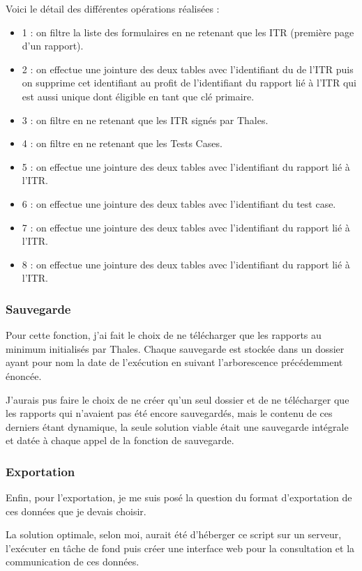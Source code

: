 Voici le détail des différentes opérations réalisées :
\begin{itemize}
\item 1 : on filtre la liste des formulaires en ne retenant que les ITR (première page d'un rapport).
\item 2 : on effectue une jointure des deux tables avec l'identifiant du de l'ITR puis on supprime cet identifiant au profit de l'identifiant du rapport lié à l'ITR qui est aussi unique dont éligible en tant que clé primaire.
\item 3 : on filtre en ne retenant que les ITR signés par Thales.
\item 4 : on filtre en ne retenant que les Tests Cases.
\item 5 : on effectue une jointure des deux tables avec l'identifiant du rapport lié à l'ITR.
\item 6 : on effectue une jointure des deux tables avec l'identifiant du test case.
\item 7 : on effectue une jointure des deux tables avec l'identifiant du rapport lié à l'ITR.
\item 8 : on effectue une jointure des deux tables avec l'identifiant du rapport lié à l'ITR.
\end{itemize}

\subsubsection{Sauvegarde}
Pour cette fonction, j'ai fait le choix de ne télécharger que les rapports au minimum initialisés par Thales. Chaque sauvegarde est stockée dans un dossier ayant pour nom la date de l'exécution en suivant l'arborescence précédemment énoncée.

J'aurais pus faire le choix de ne créer qu'un seul dossier et de ne télécharger que les rapports qui n'avaient pas été encore sauvegardés,
mais le contenu de ces derniers étant dynamique, la seule solution viable était une sauvegarde intégrale et datée à chaque appel de la fonction de sauvegarde.
\subsubsection{Exportation}
Enfin, pour l'exportation, je me suis posé la question du format d'exportation de ces données que je devais choisir.

La solution optimale, selon moi, aurait été d'héberger ce script sur un serveur, l'exécuter en tâche de fond puis créer une interface web pour la consultation et la communication de ces données.


